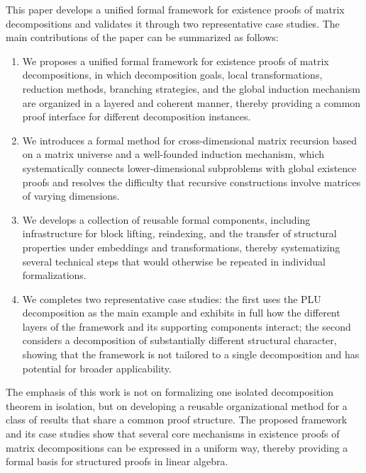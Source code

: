 \documentclass[pdflatex,sn-mathphys-num]{sn-jnl}%
\theoremstyle{thmstyleone}%
\theoremstyle{thmstyletwo}%
\theoremstyle{thmstylethree}%
\begin{document}
This paper develops a unified formal framework for existence proofs of matrix decompositions and validates it through two representative case studies. The main contributions of the paper can be summarized as follows:
\begin{enumerate}
    \item We proposes a unified formal framework for existence proofs of matrix decompositions, in which decomposition goals, local transformations, reduction methods, branching strategies, and the global induction mechanism are organized in a layered and coherent manner, thereby providing a common proof interface for different decomposition instances.

    \item We introduces a formal method for cross-dimensional matrix recursion based on a matrix universe and a well-founded induction mechanism, which systematically connects lower-dimensional subproblems with global existence proofs and resolves the difficulty that recursive constructions involve matrices of varying dimensions.

    \item We develops a collection of reusable formal components, including infrastructure for block lifting, reindexing, and the transfer of structural properties under embeddings and transformations, thereby systematizing several technical steps that would otherwise be repeated in individual formalizations.

    \item We completes two representative case studies: the first uses the PLU decomposition as the main example and exhibits in full how the different layers of the framework and its supporting components interact; the second considers a decomposition of substantially different structural character, showing that the framework is not tailored to a single decomposition and has potential for broader applicability.
\end{enumerate}

The emphasis of this work is not on formalizing one isolated decomposition theorem in isolation, but on developing a reusable organizational method for a class of results that share a common proof structure. The proposed framework and its case studies show that several core mechanisms in existence proofs of matrix decompositions can be expressed in a uniform way, thereby providing a formal basis for structured proofs in linear algebra.

\end{document}
